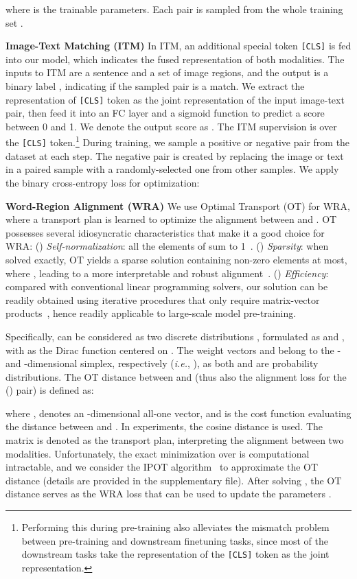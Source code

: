 \documentclass[runningheads]{llncs}
\begin{document}
where  is the trainable parameters. 
Each pair  is sampled from the whole training set .


\noindent \textbf{Image-Text Matching (ITM)} 
In ITM, an additional special token \texttt{[CLS]} is fed into our model, which indicates the fused representation of both modalities.
The inputs to ITM are a sentence and a set of image regions, and the output is a binary label , indicating if the sampled pair is a match.
We extract the representation of \texttt{[CLS]} token as the joint representation of the input image-text pair, then feed it into an FC layer and a sigmoid function to predict a score between 0 and 1. 
We denote the output score as .
The ITM supervision is over the \texttt{[CLS]} token.\footnote{Performing this during pre-training also alleviates the mismatch problem between pre-training and downstream finetuning tasks, since most of the downstream tasks take the representation of the \texttt{[CLS]} token as the joint representation.}
During training, we sample a positive or negative pair  from the dataset  at each step.
The negative pair is created by replacing the image or text in a paired sample with a randomly-selected one from other samples.
We apply the binary cross-entropy loss for optimization:


\noindent \textbf{Word-Region Alignment (WRA)} 
We use Optimal Transport (OT) for WRA, where a transport plan  is learned to optimize the alignment between  and . OT possesses several idiosyncratic characteristics that make it a good choice for WRA:
() \emph{Self-normalization}: all the elements of  sum to 1~\cite{peyre2019computational}. () \emph{Sparsity}: when solved exactly, OT yields a sparse solution  containing  non-zero elements at most, where , leading to a more interpretable and robust alignment~\cite{peyre2019computational}. () \emph{Efficiency}: compared with conventional linear programming solvers, our solution can be readily obtained using iterative procedures that only require matrix-vector products~\cite{xie2018fast}, hence readily applicable to large-scale model pre-training.

Specifically,  can be considered as two discrete distributions , formulated as
 and , with  as the Dirac function centered on . 
The weight vectors  and  belong to the - and -dimensional simplex, respectively (\emph{i.e.}, ), as both  and  are probability distributions. The OT distance between  and  (thus also the alignment loss for the () pair) is defined as:

where ,  denotes an -dimensional all-one vector, and  is the cost function evaluating the distance between  and . In experiments, the cosine distance  is used. The matrix  is denoted as the transport plan, interpreting the alignment between two modalities. Unfortunately, the exact minimization over  is computational intractable, and we consider the IPOT algorithm~\cite{xie2018fast} to approximate the OT distance (details are provided in the supplementary file). After solving , the OT distance serves as the WRA loss that can be used to update the parameters . 
\end{document}
